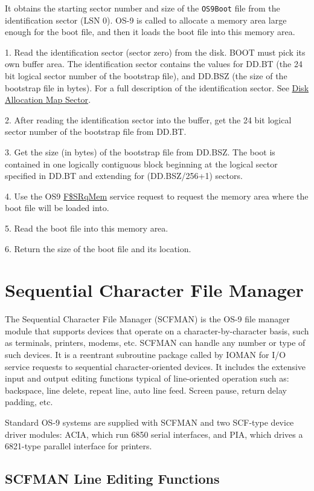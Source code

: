 \documentclass[
]{article}
\begin{document}
It obtains the starting sector number and size of the \texttt{OS9Boot}
file from the identification sector (LSN 0). OS-9 is called to allocate
a memory area large enough for the boot file, and then it loads the boot
file into this memory area.

1. Read the identification sector (sector zero) from the disk. BOOT must
pick its own buffer area. The identification sector contains the values
for DD.BT (the 24 bit logical sector number of the bootstrap file), and
DD.BSZ (the size of the bootstrap file in bytes). For a full description
of the identification sector. See \hyperref[lsn1]{Disk Allocation Map
Sector}.

2. After reading the identification sector into the buffer, get the 24
bit logical sector number of the bootstrap file from DD.BT.

3. Get the size (in bytes) of the bootstrap file from DD.BSZ. The boot
is contained in one logically contiguous block beginning at the logical
sector specified in DD.BT and extending for (DD.BSZ/256+1) sectors.

4. Use the OS9 \hyperref[f.srqmem]{F\$SRqMem} service request to request
the memory area where the boot file will be loaded into.

5. Read the boot file into this memory area.

6. Return the size of the boot file and its location.

\section{Sequential Character File Manager}

The Sequential Character File Manager (SCFMAN) is the OS-9 file manager
module that supports devices that operate on a character-by-character
basis, such as terminals, printers, modems, etc. SCFMAN can handle any
number or type of such devices. It is a reentrant subroutine package
called by IOMAN for I/O service requests to sequential
character-oriented devices. It includes the extensive input and output
editing functions typical of line-oriented operation such as: backspace,
line delete, repeat line, auto line feed. Screen pause, return delay
padding, etc.

Standard OS-9 systems are supplied with SCFMAN and two SCF-type device
driver modules: ACIA, which run 6850 serial interfaces, and PIA, which
drives a 6821-type parallel interface for printers.

\subsection{SCFMAN Line Editing Functions}
\end{document}
